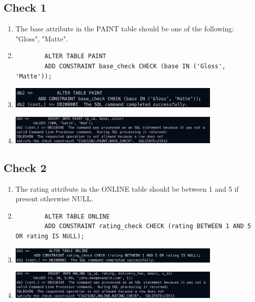 \documentclass[a4paper,11pt]{article}
\begin{document}
\subsection*{Check 1}
\begin{enumerate}[label=(\alph*)]
    \item The base attribute in the PAINT table should be one of the following: "Gloss", "Matte".
    \item
    \begin{lstlisting}
        ALTER TABLE PAINT
        ADD CONSTRAINT base_check CHECK (base IN ('Gloss', 'Matte'));
    \end{lstlisting}
    \item
        \includegraphics[width=0.8\textwidth]{Check1_c.png}
    \item
        \includegraphics[width=0.8\textwidth]{Check1_d.png}
\end{enumerate}

\subsection*{Check 2}
\begin{enumerate}[label=(\alph*)]
    \item The rating attribute in the ONLINE table should be between 1 and 5 if present otherwise NULL.
    \item
    \begin{lstlisting}
        ALTER TABLE ONLINE
        ADD CONSTRAINT rating_check CHECK (rating BETWEEN 1 AND 5 OR rating IS NULL);
    \end{lstlisting}
    \item
        \includegraphics[width=0.8\textwidth]{Check2_c.png}
    \item
        \includegraphics[width=0.8\textwidth]{Check2_d.png}
\end{enumerate}
\end{document}
